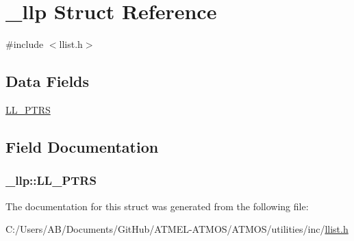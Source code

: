 \hypertarget{struct__llp}{\section{\-\_\-llp Struct Reference}
\label{struct__llp}
}


{\ttfamily \#include $<$llist.\-h$>$}

\subsection*{Data Fields}
\begin{DoxyCompactItemize}
\item 
\hyperlink{struct__llp_aeb980327ef185ef35b1b028d541463cf}{L\-L\-\_\-\-P\-T\-R\-S}
\end{DoxyCompactItemize}


\subsection{Field Documentation}
\hypertarget{struct__llp_aeb980327ef185ef35b1b028d541463cf}{
\subsubsection[{L\-L\-\_\-\-P\-T\-R\-S}]{\setlength{\rightskip}{0pt plus 5cm}\-\_\-llp\-::\-L\-L\-\_\-\-P\-T\-R\-S}}\label{struct__llp_aeb980327ef185ef35b1b028d541463cf}


The documentation for this struct was generated from the following file\-:\begin{DoxyCompactItemize}
\item 
C\-:/\-Users/\-A\-B/\-Documents/\-Git\-Hub/\-A\-T\-M\-E\-L-\/\-A\-T\-M\-O\-S/\-A\-T\-M\-O\-S/utilities/inc/\hyperlink{llist_8h}{llist.\-h}\end{DoxyCompactItemize}

